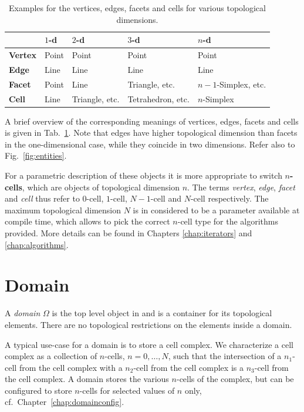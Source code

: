 \begin{table}[tb]
 \centering 
 \renewcommand{\arraystretch}{1.3}
\begin{tabular}{|l|l|l|l|l|}
\hline
          &  $1$-d & $2$-d & $3$-d & $n$-d \\
\hline
 \textbf{Vertex}   & Point  & Point & Point & Point \\
 \textbf{Edge}     & Line   & Line  & Line  & Line \\
 \textbf{Facet}   & Point  & Line  & Triangle, etc. & $n-1$-Simplex, etc. \\
 \textbf{Cell}   & Line   & Triangle, etc. & Tetrahedron, etc. & $n$-Simplex \\
\hline
\end{tabular}
\caption{Examples for the vertices, edges, facets and cells for various topological dimensions.}
\label{tab:vertex-edge-facet-cell}
\end{table}

A brief overview of the corresponding meanings of vertices, edges, facets and cells is given in Tab.~\ref{tab:vertex-edge-facet-cell}. Note that edges have higher topological dimension than facets in the one-dimensional case, while they coincide in two dimensions. Refer also to Fig.~\ref{fig:entities}.

For a parametric description of these objects it is more appropriate to switch \textbf{$n$-cells}, which are objects of topological dimension $n$. The terms \emph{vertex}, \emph{edge}, \emph{facet} and \emph{cell} thus refer to $0$-cell, $1$-cell, $N-1$-cell and $N$-cell respectively. The maximum topological dimension $N$ is in {\ViennaGrid} considered to be a parameter available at compile time, which allows to pick the correct $n$-cell type for the algorithms provided. More details can be found in Chapters \ref{chap:iterators} and \ref{chap:algorithms}.


\section{Domain}
A \emph{domain} $\Omega$ is the top level object in {\ViennaGrid} and is a container for its topological elements. There are no topological restrictions on the elements inside a domain. 

A typical use-case for a domain is to store a cell complex. We characterize a cell complex as a collection of $n$-cells, $n=0, \ldots, N$, such that the intersection of a $n_1$-cell from the cell complex with a $n_2$-cell from the cell complex is a $n_3$-cell from the cell complex. A domain stores the various $n$-cells of the complex, but can be configured to store $n$-cells for selected values of $n$ only, cf.~Chapter~\ref{chap:domainconfig}.

